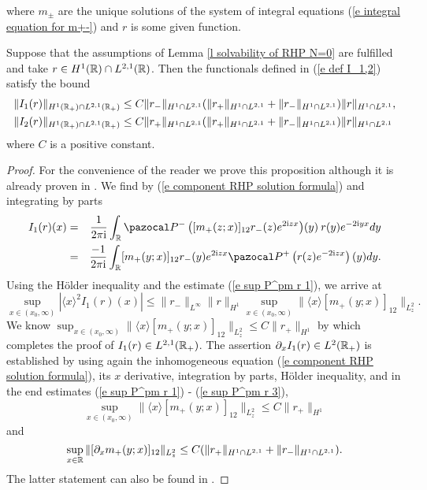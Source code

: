 where $m_{\pm}$ are the unique solutions of the system of integral equations (\ref{e integral equation for m+-}) and $r$ is some given function.
\begin{prop}\label{p bound <x>^2I}
    Suppose that the assumptions of Lemma \ref{l solvability of RHP N=0} are fulfilled and take $r\in H^1(\mathbb R)\cap L^{2,1}(\mathbb R)$. Then the functionals defined in (\ref{e def I_1,2}) satisfy the bound
    \begin{equation}\label{e bound <x>^2I}
        \begin{aligned}
            &\|I_1(r)\|_{H^1(\mathbb R_+)\cap L^{2,1}(\mathbb R_+)}\leq C\|r_-\|_{H^1\cap L^{2,1}}(\|r_+\|_{H^1\cap L^{2,1}}+\|r_-\|_{H^1\cap L^{2,1}})\|r\|_{H^1\cap L^{2,1}},\\
            &\|I_2(r)\|_{H^1(\mathbb R_+)\cap L^{2,1}(\mathbb R_+)}\leq C\|r_+\|_{H^1\cap L^{2,1}}(\|r_+\|_{H^1\cap L^{2,1}}+\|r_-\|_{H^1\cap L^{2,1}})\|r\|_{H^1\cap L^{2,1}}
        \end{aligned}
    \end{equation}
    where $C$ is a positive constant.
\end{prop}
\begin{proof}
    For the convenience of the reader we prove this proposition although it is already proven in \cite{Pelinovsky2016}. We find by (\ref{e component RHP solution formula}) and integrating by parts
    \begin{eqnarray*}
      I_1(r)(x) &=& \frac{1}{2\pi\ii} \int_{\Real}\Pm\left([m_+(z;x)]_{12} r_-(z) e^{2\ii zx}\right)\!(y)\: r(y) e^{-2\ii yx}dy\\
       &=&   \frac{-1}{2\pi\ii} \int_{\Real}[m_+(y;x)]_{12} r_-(y) e^{2\ii zx}\Pp\left(r(z) e^{-2\ii zx}\right)(y) dy.
    \end{eqnarray*}
    Using the H\"{o}lder inequality and the estimate (\ref{e sup P^pm r 1}), we arrive at
    \begin{equation*}
        \sup_{x\in(x_0,\infty)}|\langle x\rangle^2I_1(r)(x)|\leq \|r_-\|_{L^{\infty}}\|r\|_{H^1}\sup_{x\in(x_0,\infty)} \|\langle x\rangle[m_+(y;x)]_{12}\|_{L^2_z}.
    \end{equation*}
    We know $\sup_{x\in(x_0,\infty)} \|\langle x\rangle[m_+(y;x)]_{12}\|_{L^2_z}\leq C\|r_+\|_{H^1}$ by \cite[Lemma 10]{Pelinovsky2016} which completes the proof of $I_1(r)\in L^{2,1}(\mathbb R_+)$. The assertion $\partial_x I_1(r)\in L^{2}(\mathbb R_+)$ is established by using again the inhomogeneous equation (\ref{e component RHP solution formula}), its $x$ derivative, integration by parts, H\"{o}lder inequality, and in the end estimates (\ref{e sup P^pm r 1}) - (\ref{e sup P^pm r 3}),
    \begin{equation*}
        \sup_{x\in(x_0,\infty)} \|\langle x\rangle[m_+(y;x)]_{12}\|_{L^2_z}\leq C\|r_+\|_{H^1}
    \end{equation*}
    and
    \begin{equation*}
        \sup_{x\in\mathbb R} \|[\partial_x m_+(y;x)]_{12}\|_{L^2_z}\leq C(\|r_+\|_{H^1\cap L^{2,1}}+\|r_-\|_{H^1\cap L^{2,1}}).
    \end{equation*}
    The latter statement can also be found in \cite[Lemma 10]{Pelinovsky2016}.
\end{proof}

